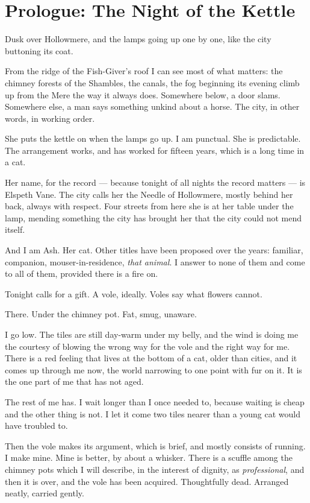 \chapter*{Prologue: The Night of the Kettle}

Dusk over Hollowmere, and the lamps going up one by one, like the city buttoning its coat.

From the ridge of the Fish-Giver's roof I can see most of what matters: the chimney forests of the Shambles, the canals, the fog beginning its evening climb up from the Mere the way it always does. Somewhere below, a door slams. Somewhere else, a man says something unkind about a horse. The city, in other words, in working order.

She puts the kettle on when the lamps go up. I am punctual. She is predictable. The arrangement works, and has worked for fifteen years, which is a long time in a cat.

Her name, for the record --- because tonight of all nights the record matters --- is Elspeth Vane. The city calls her the Needle of Hollowmere, mostly behind her back, always with respect. Four streets from here she is at her table under the lamp, mending something the city has brought her that the city could not mend itself.

And I am Ash. Her cat. Other titles have been proposed over the years: familiar, companion, mouser-in-residence, \emph{that animal}. I answer to none of them and come to all of them, provided there is a fire on.

Tonight calls for a gift. A vole, ideally. Voles say what flowers cannot.

\scenebreak

There. Under the chimney pot. Fat, smug, unaware.

I go low. The tiles are still day-warm under my belly, and the wind is doing me the courtesy of blowing the wrong way for the vole and the right way for me. There is a red feeling that lives at the bottom of a cat, older than cities, and it comes up through me now, the world narrowing to one point with fur on it. It is the one part of me that has not aged.

The rest of me has. I wait longer than I once needed to, because waiting is cheap and the other thing is not. I let it come two tiles nearer than a young cat would have troubled to.

Then the vole makes its argument, which is brief, and mostly consists of running. I make mine. Mine is better, by about a whisker. There is a scuffle among the chimney pots which I will describe, in the interest of dignity, as \emph{professional}, and then it is over, and the vole has been acquired. Thoughtfully dead. Arranged neatly, carried gently.

